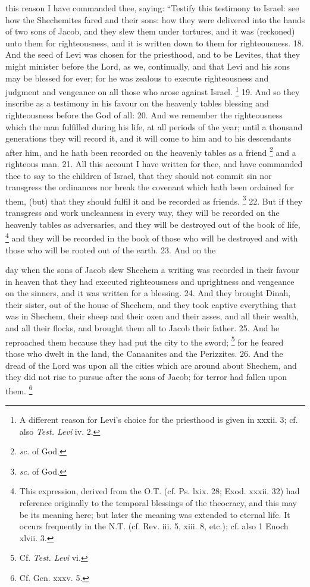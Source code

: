 this reason I have commanded thee, saying: ``Testify this testimony to Israel: see how the Shechemites fared and their sons: how they were delivered into the hands of two sons of Jacob, and they slew them under tortures, and it was (reckoned) unto them for righteousness, and it is written down to them for righteousness. 18. And the seed of Levi was chosen for the priesthood, and to be Levites, that they might minister before the Lord, as we, continually, and that Levi and his sons may be blessed for ever; for he was zealous to execute righteousness and judgment and vengeance on all those who arose against Israel. \footnote{A different reason for Levi's choice for the priesthood is given in xxxii. 3; cf. also \emph{Test. Levi} iv. 2.} 19. And so they inscribe as a testimony in his favour on the heavenly tables blessing and righteousness before the God of all: 20. And we remember the righteousness which the man fulfilled during his life, at all periods of the year; until a thousand generations they will record it, and it will come to him and to his descendants after him, and he hath been recorded on the heavenly tables as a friend \footnote{\emph{sc.} of God.} and a righteous man. 21. All this account I have written for thee, and have commanded thee to say to the children of Israel, that they should not commit sin nor transgress the ordinances nor break the covenant which hath been ordained for them, (but) that they should fulfil it and be recorded as friends. \footnote{\emph{sc.} of God.} 22. But if they transgress and work uncleanness in every way, they will be recorded on the heavenly tables as adversaries, and they will be destroyed out of the book of life, \footnote{This expression, derived from the O.T. (cf. Ps. lxix. 28; Exod. xxxii. 32) had reference originally to the temporal blessings of the theocracy, and this may be its meaning here; but later the meaning was extended to eternal life. It occurs frequently in the N.T. (cf. Rev. iii. 5, xiii. 8, etc.); cf. also 1 Enoch xlvii. 3.} and they will be recorded in the book of those who will be destroyed and with those who will be rooted out of the earth. 23. And on the

day when the sons of Jacob slew Shechem a writing was recorded in their favour in heaven that they had executed righteousness and uprightness and vengeance on the sinners, and it was written for a blessing. 24. And they brought Dinah, their sister, out of the house of Shechem, and they took captive everything that was in Shechem, their sheep and their oxen and their asses, and all their wealth, and all their flocks, and brought them all to Jacob their father. 25. And he reproached them because they had put the city to the sword; \footnote{Cf. \emph{Test. Levi} vi.} for he feared those who dwelt in the land, the Canaanites and the Perizzites. 26. And the dread of the Lord was upon all the cities which are around about Shechem, and they did not rise to pursue after the sons of Jacob; for terror had fallen upon them. \footnote{Cf. Gen. xxxv. 5.}

